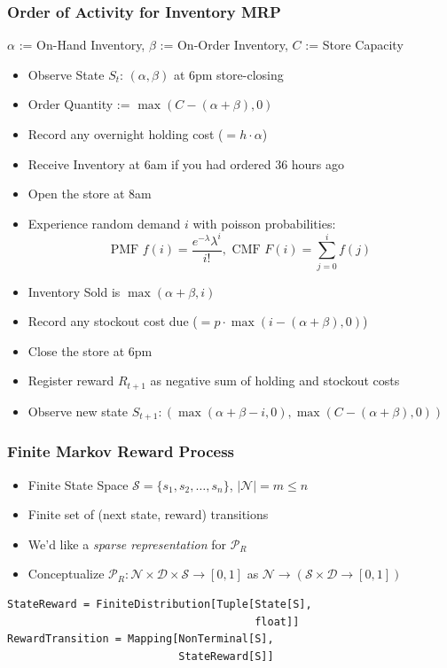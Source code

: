 \documentclass[handout]{beamer}
\begin{document}
\begin{frame}
\frametitle{Order of Activity for Inventory MRP}
\pause
$\alpha$ := On-Hand Inventory, $\beta$ := On-Order Inventory, $C$ := Store Capacity
\pause
\begin{itemize}[<+->]
\item Observe State $S_t$: $(\alpha, \beta)$ at 6pm store-closing
\item Order Quantity := $\max(C - (\alpha + \beta), 0)$
\item Record any overnight holding cost ($=h \cdot \alpha$)
\item Receive Inventory at 6am if you had ordered 36 hours ago
\item Open the store at 8am
\item Experience random demand $i$ with poisson probabilities:
$$\text{PMF } f(i) = \frac {e^{-\lambda} \lambda^i} {i!}, \text{ CMF } F(i) = \sum_{j=0}^i f(j)$$
\item Inventory Sold is $\max(\alpha + \beta, i)$
\item Record any stockout cost due ($=p\cdot \max(i - (\alpha + \beta), 0)$)
\item Close the store at 6pm
\item Register reward $R_{t+1}$ as negative sum of holding and stockout costs
\item Observe new state $S_{t+1}: (\max(\alpha + \beta - i, 0), \max(C - (\alpha + \beta), 0))$
\end{itemize}
\end{frame}

\begin{frame}[fragile]
\frametitle{Finite Markov Reward Process}
\pause
\begin{itemize}[<+->]
\item Finite State Space $\mathcal{S} = \{s_1, s_2, \ldots, s_n\}$, $|\mathcal{N}| = m\leq n$
\item Finite set of (next state, reward) transitions
\item We'd like a {\em sparse representation} for $\mathcal{P}_R$
\item Conceptualize $\mathcal{P}_R : \mathcal{N} \times \mathcal{D} \times \mathcal{S} \rightarrow [0, 1]$ as $\mathcal{N} \rightarrow (\mathcal{S} \times \mathcal{D} \rightarrow [0, 1])$
\end{itemize}
\pause
\begin{lstlisting}
StateReward = FiniteDistribution[Tuple[State[S],
                                       float]]
RewardTransition = Mapping[NonTerminal[S],
                           StateReward[S]]
\end{lstlisting}
\end{frame}
\end{document}
